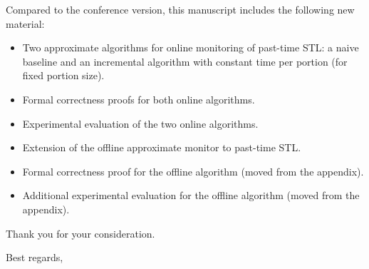 \documentclass[10pt]{letter}
\begin{document}
\begin{letter}
		
		Compared to the conference version, this manuscript includes the following new material:
		\begin{itemize}
			\item Two approximate algorithms for online monitoring of past-time STL: a naive baseline and an incremental algorithm with constant time per portion (for fixed portion size).
			\item Formal correctness proofs for both online algorithms.
			\item Experimental evaluation of the two online algorithms.
			\item Extension of the offline approximate monitor to past-time STL.
			\item Formal correctness proof for the offline algorithm (moved from the appendix).
			\item Additional experimental evaluation for the offline algorithm (moved from the appendix).
		\end{itemize}
		Thank you for your consideration. 
		
		\closing{Best regards,} %
	\end{letter}
\end{document}
